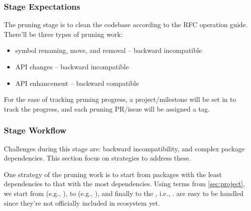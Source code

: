 \subsubsection*{Stage Expectations}

The pruning stage is to clean the codebase according to the RFC operation guide. There'll be three types of pruning work:
\begin{itemize}
    \item symbol renaming, move, and removal -- backward incompatible
    \item API changes -- backward incompatible
    \item API enhancement -- backward compatible
\end{itemize}
For the ease of tracking pruning progress, a project/milestone will be set in \repoimages{} to track the progress, and each pruning PR/issue will be assigned a tag. \par

\subsubsection*{Stage Workflow}

Challenges during this stage are: backward incompatibility, and complex package dependencies. This section focus on strategies to address these. \par

One strategy of the pruning work is to start from packages with the least dependencies to that with the most dependencies. Using terms from \cref{sec:project}, we start from  (e.g., \repoimagecore{}), to  (e.g., \repoimagetransformations{}), and finally to the , i.e., \repoimages{}.  are easy to be handled since they're not officially included in \images{} ecosystem yet. \par

